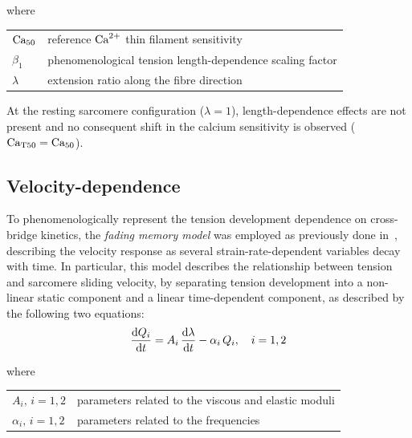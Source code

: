 \noindent
where

\vspace{0.2cm}
\begin{tabular}{ll}
    $\textrm{Ca}_{50}$   & reference $\textrm{Ca}^{2+}$ thin filament sensitivity \\
    $\beta_1$ & phenomenological tension length-dependence scaling factor \\
    $\lambda$ & extension ratio along the fibre direction
\end{tabular}

\vspace{0.3cm}\noindent
At the resting sarcomere configuration ($\lambda=1$), length-dependence effects are not present and no consequent shift in the calcium sensitivity is observed ($\textrm{Ca}_{\textrm{T}50}=\textrm{Ca}_{50}$).



%
%
%
\subsection{Velocity-dependence}\label{sec:ch2velocitydependence}
To phenomenologically represent the tension development dependence on cross-bridge kinetics, the \emph{fading memory model} was employed as previously done in~\cite{Niederer:2006}, describing the velocity response as several strain-rate-dependent variables decay with time. In particular, this model describes the relationship between tension and sarcomere sliding velocity, by separating tension development into a non-linear static component and a linear time-dependent component, as described by the following two equations:
%
\begin{equation}
    \dfrac{\mathrm{d}{Q_i}}{\mathrm{d}{t}} = A_i\,\dfrac{\mathrm{d}{\lambda}}{\mathrm{d}{t}}-\alpha_i\,Q_i,\quad i=1,2
\end{equation}

\noindent
where

\vspace{0.2cm}
\begin{tabular}{ll}
    $A_i,\,i=1,2$      & parameters related to the viscous and elastic moduli \\
    $\alpha_i,\,i=1,2$ & parameters related to the frequencies
\end{tabular}

